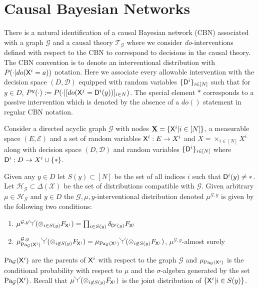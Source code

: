 \section{Causal Bayesian Networks}

There is a natural identification of a causal Bayesian network (CBN) associated with a graph $\mathcal{G}$ and a causal theory $\mathscr{T}_{\mathcal{G}}$ where we consider \emph{do}-interventions defined with respect to the CBN to correspond to decisions in the causal theory. The CBN convention is to denote an interventional distribution with $P(\cdot|do(\mathsf{X}^i=a))$ notation. Here we associate every allowable intervention with the decision space $(D,\mathcal{D})$ equipped with random variables $\{\mathsf{D}^i\}_{i\in[N]}$ such that for $y\in D$, $P^y(\cdot) := P(\cdot|[do(\mathsf{X}^j=\mathsf{D}^i(y))]_{i\in N})$. The special element $*$ corresponds to a passive intervention which is denoted by the absence of a $do()$ statement in regular CBN notation.

\begin{definition}\label{def:CBN}
Consider a directed acyclic graph $\mathcal{G}$ with nodes $\mathbf{X}=\{\mathsf{X}^i|i\in [N]\}$, a measurable space $(E,\mathcal{E})$ and a set of random variables $\mathsf{X}^i:E\to X^i$ and $X=\times_{i\in[N]} X^i$ along with decision space $(D,\mathcal{D})$ and random variables $\{\mathsf{D}^i\}_{i\in [N]}$ where $\mathsf{D}^i:D\to X^i\cup\{*\}$.

Given any $y\in D$ let $S(y)\subset[N]$ be the set of all indices $i$ such that $\mathsf{D}^i(y)\neq *$. Let $\mathscr{H}_\mathcal{G}\subset\Delta(\mathcal{X})$ be the set of distributions compatible with $\mathcal{G}$. Given arbitrary $\mu\in \mathscr{H}_\mathcal{G}$ and $y\in D$ the $\mathcal{G},\mu,y$-interventional distribution denoted $\mu^{\mathcal{G},y}$ is given by the following two conditions:
\begin{enumerate}
    \item $\mu^{\mathcal{G},y}\splitter{0.15}(\otimes_{i\in S(y)} F_{\RV{X}^i})=\prod_{i\in S(y)} \delta_{\RV{D}^i(y)} F_{\RV{X}^i}$
    \item $\mu^{\mathcal{G},y}_{\PA{\mathcal{G}}{\RV{X}^i}} \splitter{0.15}(\otimes_{i\not\in S(y)} F_{\RV{X}^i})=\mu_{\PA{\mathcal{G}}{\RV{X}^i}}\splitter{0.15}(\otimes_{i\not\in S(y)} F_{\RV{X}^i}) $, $\mu^{\mathcal{G},y}$-almost surely
\end{enumerate}
\end{definition}

$\text{Pa}_{\mathcal{G}}(\mathsf{X}^i)$ are the parents of $\mathsf{X}^i$ with respect to the graph $\mathcal{G}$ and $\mu_{\text{Pa}_{\mathcal{G}}(\mathsf{X}^i)}$ is the conditional probability with respect to $\mu$ and the $\sigma$-algebra generated by the set $\text{Pa}_{\mathcal{G}}(\mathsf{X}^i)$. Recall that $\mu \splitter{0.15}(\otimes_{i\not\in S(y)} F_{\RV{X}^i})$ is the joint distribution of $\{\mathsf{X}^i|i\in S(y)\}$.


